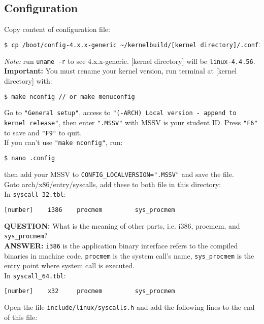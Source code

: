 \documentclass[12pt]{article}
\begin{document}
        \subsection{Configuration}
        Copy content of configuration file:
        \begin{lstlisting}[language=bash]
$ cp /boot/config-4.x.x-generic ~/kernelbuild/[kernel directory]/.config\end{lstlisting}
        \textit{Note:} run \texttt{uname -r} to see 4.x.x-generic. 
        [kernel directory] will be \texttt{linux-4.4.56}.\\
        \textbf{Important:} You must rename your kernel version, run terminal 
        at [kernel directory] with:
        \begin{lstlisting}[language=bash]
$ make nconfig // or make menuconfig\end{lstlisting}
        Go to \texttt{"General setup"}, access to 
        \texttt{"(-ARCH) Local version - append to kernel release"}, 
        then enter \texttt{".MSSV"} with MSSV is your student ID. Press \texttt{"F6"} to save 
        and \texttt{"F9"} to quit.\\
        If you can't use \texttt{"make nconfig"}, run:
        \begin{lstlisting}[language=bash]
$ nano .config\end{lstlisting}
        then add your MSSV to \texttt{CONFIG\_LOCALVERSION=".MSSV"} and save the file.\\
        Goto arch/x86/entry/syscalls, add these to both file in this directory:\\
        In \texttt{syscall\_32.tbl}:
        \begin{lstlisting}[language=bash]
[number]    i386    procmem         sys_procmem\end{lstlisting}
        \textbf{QUESTION:} What is the meaning of other parts, i.e. i386, procmem, and \texttt{sys\_procmem}?\\
        \textbf{ANSWER:} \texttt{i386} is the application binary interface refers to the compiled binaries in machine code, 
        \texttt{procmem} is the system call's name, \texttt{sys\_procmem} is the entry point where system call is executed.\\
        In \texttt{syscall\_64.tbl}:
        \begin{lstlisting}[language=bash]
[number]    x32     procmem         sys_procmem\end{lstlisting}
        Open the file \texttt{include/linux/syscalls.h} and add the following lines to the end of this file:
\end{document}
